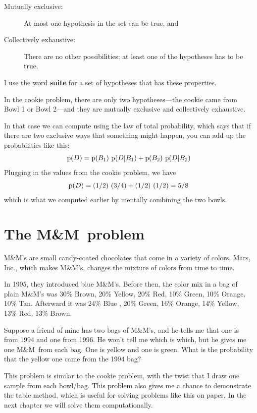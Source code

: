\documentclass[12pt]{book}
\begin{document}
\begin{description}

\item[Mutually exclusive:] At most one hypothesis in
the set can be true, and

\item[Collectively exhaustive:] There are no other
possibilities; at least one of the hypotheses has to be true.

\end{description}

I use the word {\bf suite} for a set of hypotheses that has these
properties.

In the cookie problem, there are only two hypotheses---the cookie
came from Bowl 1 or Bowl 2---and they are mutually exclusive and
collectively exhaustive.

In that case we can compute  using the law of total probability,
which says that if there are two exclusive ways that something
might happen, you can add up the probabilities like this:
%
\[ \mathrm{p}(D) = \mathrm{p}(B_1)~\mathrm{p}(D|B_1) + \mathrm{p}(B_2)~\mathrm{p}(D|B_2) \]
%
Plugging in the values from the cookie problem, we have
%
\[ \mathrm{p}(D) = (1/2)~(3/4) + (1/2)~(1/2) = 5/8 \]
%
which is what we computed earlier by mentally combining the two
bowls.


\newcommand{\MM}{M\&M}

\section{The \MM~problem}

\MM's are small candy-coated chocolates that come in a variety of
colors.  Mars, Inc., which makes \MM's, changes the mixture of
colors from time to time.

In 1995, they introduced blue \MM's.  Before then, the color mix in
a bag of plain \MM's was 30\% Brown, 20\% Yellow, 20\% Red, 10\%
Green, 10\% Orange, 10\% Tan.  Afterward it was 24\% Blue , 20\%
Green, 16\% Orange, 14\% Yellow, 13\% Red, 13\% Brown.

Suppose a friend of mine has two bags of \MM's, and he tells me
that one is from 1994 and one from 1996.  He won't tell me which is
which, but he gives me one \MM~from each bag.  One is yellow and
one is green.  What is the probability that the yellow one came
from the 1994 bag?

This problem is similar to the cookie problem, with the twist that I
draw one sample from each bowl/bag.  This problem also gives me a
chance to demonstrate the table method, which is useful for solving
problems like this on paper.  In the next chapter we will
solve them computationally.
\end{document}
